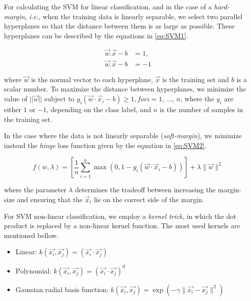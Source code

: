 For calculating the \ac{SVM} for linear classification, and in the case of a \textit{hard-margin}, \textit{i.e.}, when the training data is linearly separable, we select two parallel hyperplanes so that the distance between them is as large as possible.
These hyperplanes can be described by the equations in \ref{eq:SVM1}.

\begin{equation}
\label{eq:SVM1}
\begin{split}
\vec{w}.\vec{x}-b&=1, \\
\vec{w}.\vec{x}-b&=-1
\end{split}
\end{equation}

where $\vec{w}$ is the normal vector to each hyperplane, $\vec{x}$ is the training set and $b$ is a scalar number.
To maximize the distance between hyperplanes, we minimize the value of $||\vec{w}||$ subject to ${\displaystyle y_{i}({\vec {w}}\cdot {\vec {x}}_{i}-b)\geq 1,} for  {\displaystyle i=1,\,\ldots ,\,n} $, where the $y_{i}$ are either $1$ or $-1$, depending on the class label, and $n$ is the number of samples in the training set.

In the case where the data is not linearly separable (\textit{soft-margin}), we minimize instead the \textit{hinge} loss function given by the equation in \ref{eq:SVM2}.

\begin{equation}
\label{eq:SVM2}
f(w,\lambda)={\displaystyle \left[{\frac {1}{n}}\sum _{i=1}^{n}\max \left(0,1-y_{i}({\vec {w}}\cdot {\vec {x}}_{i}-b)\right)\right]+\lambda \lVert {\vec {w}}\rVert ^{2}}
\end{equation}

where the parameter $\lambda$ determines the tradeoff between increasing the margin-size and ensuring that the ${\vec {x}}_{i}$ lie on the correct side of the margin.

For \ac{SVM} non-linear classification, we employ a \textit{kernel trick}, in which the dot product is replaced by a non-linear kernel function. The most used kernels are mentioned bellow.

\begin{itemize}
    \setlength\itemsep{1em}
    \item Linear: ${\displaystyle k({\vec {x_{i}}},{\vec {x_{j}}})=({\vec {x_{i}}}\cdot {\vec {x_{j}}})}$

    \item Polynomial: ${\displaystyle k({\vec {x_{i}}},{\vec {x_{j}}})=({\vec {x_{i}}}\cdot {\vec {x_{j}}})^{d}}$

    \item Gaussian radial basis function: ${\displaystyle k({\vec {x_{i}}},{\vec {x_{j}}})=\exp(-\gamma \|{\vec {x_{i}}}-{\vec {x_{j}}}\|^{2})}$
\end{itemize}


